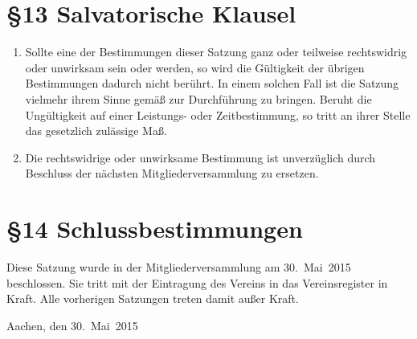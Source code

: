 \documentclass[ngerman]{article}
\begin{document}
\section*{§13 Salvatorische Klausel}
\begin{enumerate}
  \item Sollte eine der Bestimmungen dieser Satzung ganz oder teilweise rechtswidrig oder unwirksam sein oder werden, so wird die Gültigkeit der übrigen Bestimmungen dadurch nicht berührt. In einem solchen Fall ist die Satzung vielmehr ihrem Sinne gemäß zur Durchführung zu bringen. Beruht die Ungültigkeit auf einer Leistungs- oder Zeitbestimmung, so tritt an ihrer Stelle das gesetzlich zulässige Maß.

  \item Die rechtswidrige oder unwirksame Bestimmung ist unverzüglich durch Beschluss der nächsten Mitgliederversammlung zu ersetzen.
\end{enumerate}

\section*{§14 Schlussbestimmungen}
Diese Satzung wurde in der Mitgliederversammlung am 30.~Mai~2015 beschlossen. Sie tritt mit der Eintragung des Vereins in das Vereinsregister in Kraft. Alle vorherigen Satzungen treten damit außer Kraft.

Aachen, den 30.~Mai~2015
\end{document}
